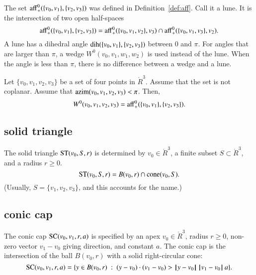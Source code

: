 The set ${\operatorname{aff}}^0_+(\{v_0,v_1\},\{v_2,v_3\})$ was defined
in Definition~\ref{def:aff}.  Call it a lune.  It is the intersection
of two open half-spaces
    $$
    {\operatorname{aff}}^0_+(\{v_0,v_1\},\{v_2,v_3\})
    ={\operatorname{aff}}^0_+(\{v_0,v_1,v_2\},v_3)\cap
    {\operatorname{aff}}^0_+(\{v_0,v_1,v_3\},v_2).
        $$
A lune has a dihedral angle $\operatorname{dih}(\{v_0,v_1\},\{v_2,v_3\})$ between
$0$ and $\pi$.   For angles that are larger than $\pi$,   a wedge
$W^0(v_0,v_1,w_1,w_2)$ is used instead of the lune.  
When the angle is less than $\pi$, there is no difference between
a wedge and a lune.
%
%
%
%
%
%

\begin{lemma} Let $\{v_0,v_1,v_2,v_3\}$ be a set of four points
in $\ring{R}^3$.  Assume that the set is not coplanar.
Assume that ${\operatorname{azim}}(v_0,v_1,v_2,v_3)<\pi$.
Then,
   $$W^0(v_0,v_1,v_2,v_3) = {\operatorname{aff}}^0_+(\{v_0,v_1\},\{v_2,v_3\}).$$
%
\end{lemma}


\subsection{solid triangle}
%

\begin{definition} The solid triangle ${\operatorname{ST}}(v_0,S,r)$ is
determined by  $v_0\in\ring{R}^3$, a finite subset $S\subset\ring{R}^3$,
and a radius $r\ge0$. 
    $$
    {\operatorname{ST}}(v_0,S,r) = 
    B(v_0,r)\cap {\operatorname{cone}}(v_0,S).
    $$
(Usually, $S=\{v_1,v_2,v_3\}$, and this accounts for
the name.)
%
%
%
\end{definition}



\subsection{conic cap}
%


\begin{definition}
The conic cap ${\operatorname{SC}}(v_0,v_1,r,a)$ is specified by an apex
$v_0\in\ring{R}^3$,  radius $r\ge0$,  non-zero vector $v_1-v_0$ giving
direction, and constant $a$.  The conic cap is the intersection of
the ball $B(v_0,r)$ with a solid right-circular cone:
    $$
    {\operatorname{SC}}(v_0,v_1,r,a)=\{y \in B(v_0,r) \ :\  (y-v_0)\cdot (v_1-v_0) > {\hskip0.1em|\hskip-0.15em|\hskip0.1em}y - v_0{\hskip0.1em|\hskip-0.15em|\hskip0.1em}\, {\hskip0.1em|\hskip-0.15em|\hskip0.1em}v_1 - v_0{\hskip0.1em|\hskip-0.15em|\hskip0.1em}\, a\}.
    $$
%
%
%
%
\end{definition}

